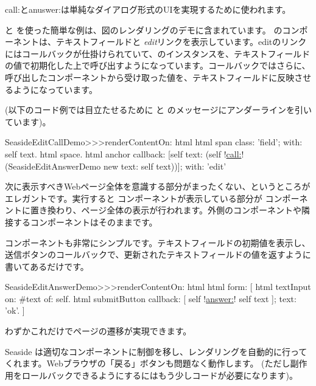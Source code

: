 \documentclass[a4paper,10pt,twoside]{book}
\begin{document}
call:とanuswer:は単純なダイアログ形式のUIを実現するために使われます。

  と  を使った簡単な例は、図のレンダリングのデモに含まれています。
  のコンポーネントは、テキストフィールドと \emph{edit}リンクを表示しています。editのリンクにはコールバックが仕掛けられていて、のインスタンスを、テキストフィールドの値で初期化した上で呼び出すようになっています。コールバックではさらに、呼び出したコンポーネントから受け取った値を、テキストフィールドに反映させるようになっています。
 
(以下のコード例では目立たせるために  と  のメッセージにアンダーラインを引いています)。

\begin{code}{}
SeasideEditCallDemo>>>renderContentOn: html 
	html span
		class: 'field';
		with: self text.
	html space.
	html anchor
		callback: [self text: (self !\underline{call:}! (SeasideEditAnswerDemo new text: self text))];
		with: 'edit'
\end{code}{}

次に表示すべきWebページ全体を意識する部分がまったくない、というところがエレガントです。実行すると  コンポーネントが表示している部分が  コンポーネントに置き換わり、ページ全体の表示が行われます。外側のコンポーネントや隣接するコンポーネントはそのままです。


 コンポーネントも非常にシンプルです。テキストフィールドの初期値を表示し、送信ボタンのコールバックで、更新されたテキストフィールドの値を返すように書いてあるだけです。

\begin{code}{}
SeasideEditAnswerDemo>>>renderContentOn: html
	html form: [
		html textInput
			on: #text of: self.
		html submitButton
			callback: [ self !\underline{answer:}! self text ];
			text: 'ok'.
		]
\end{code}{}

わずかこれだけでページの遷移が実現できます。

Seaside は適切なコンポーネントに制御を移し、レンダリングを自動的に行ってくれます。Webブラウザの「戻る」ボタンも問題なく動作します。 (ただし副作用をロールバックできるようにするにはもう少しコードが必要になります)。
\end{document}
